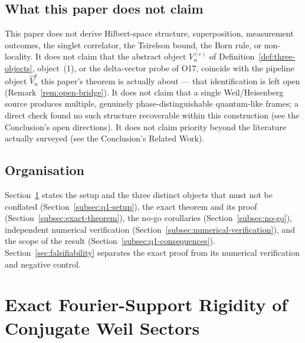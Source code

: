 \documentclass[11pt,a4paper]{article}
\begin{document}
  \subsection*{What this paper does not claim}

    This paper does not derive Hilbert-space structure, superposition, measurement outcomes, the
    singlet correlator, the Tsirelson bound, the Born rule, or non-locality. It does not claim that
    the abstract object $V_n^{(c)}$ of Definition~\ref{def:three-objects}, object~(1), or the
    delta-vector probe of O17, coincide with the pipeline object $\widehat V_n^{\mathbf c}$ this
    paper's theorem is actually about --- that identification is left open
    (Remark~\ref{rem:open-bridge}). It does not claim that a single Weil/Heisenberg source
    produces multiple, genuinely phase-distinguishable quantum-like frames; a direct check found no
    such structure recoverable within this construction (see the Conclusion's open directions). It
    does not claim priority beyond the literature actually surveyed (see the Conclusion's Related
    Work).

  \subsection*{Organisation}

    Section~\ref{sec:admissibility-phase-coherence} states the setup and the three distinct objects
    that must not be conflated (Section~\ref{subsec:q1-setup}), the exact theorem and its proof
    (Section~\ref{subsec:exact-theorem}), the no-go corollaries
    (Section~\ref{subsec:no-go}), independent numerical verification
    (Section~\ref{subsec:numerical-verification}), and the scope of the result
    (Section~\ref{subsec:q1-consequences}). Section~\ref{sec:falsifiability} separates the exact
    proof from its numerical verification and negative control.



  \section{Exact Fourier-Support Rigidity of Conjugate Weil Sectors}
  \label{sec:admissibility-phase-coherence}
\end{document}
